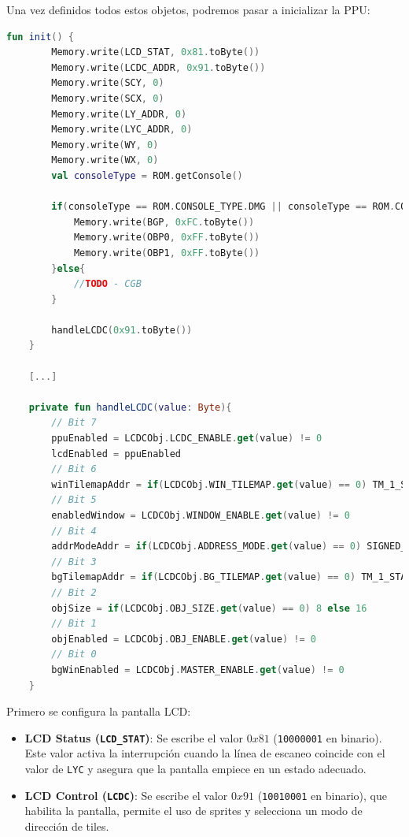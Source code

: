 Una vez definidos todos estos objetos, podremos pasar a inicializar la PPU:

\begin{lstlisting}[language=Kotlin, caption={Inicialización de la PPU.}, label={code:ppuinit}]
    fun init() {
        Memory.write(LCD_STAT, 0x81.toByte())
        Memory.write(LCDC_ADDR, 0x91.toByte())
        Memory.write(SCY, 0)
        Memory.write(SCX, 0)
        Memory.write(LY_ADDR, 0)
        Memory.write(LYC_ADDR, 0)
        Memory.write(WY, 0)
        Memory.write(WX, 0)
        val consoleType = ROM.getConsole()

        if(consoleType == ROM.CONSOLE_TYPE.DMG || consoleType == ROM.CONSOLE_TYPE.DMG_CGB) {
            Memory.write(BGP, 0xFC.toByte())
            Memory.write(OBP0, 0xFF.toByte())
            Memory.write(OBP1, 0xFF.toByte())
        }else{
            //TODO - CGB
        }

        handleLCDC(0x91.toByte())
    }

    [...]

    private fun handleLCDC(value: Byte){
        // Bit 7
        ppuEnabled = LCDCObj.LCDC_ENABLE.get(value) != 0
        lcdEnabled = ppuEnabled
        // Bit 6
        winTilemapAddr = if(LCDCObj.WIN_TILEMAP.get(value) == 0) TM_1_START else TM_2_START
        // Bit 5
        enabledWindow = LCDCObj.WINDOW_ENABLE.get(value) != 0
        // Bit 4
        addrModeAddr = if(LCDCObj.ADDRESS_MODE.get(value) == 0) SIGNED_TILE_REGION else VRAM_START
        // Bit 3
        bgTilemapAddr = if(LCDCObj.BG_TILEMAP.get(value) == 0) TM_1_START else TM_2_START
        // Bit 2
        objSize = if(LCDCObj.OBJ_SIZE.get(value) == 0) 8 else 16
        // Bit 1
        objEnabled = LCDCObj.OBJ_ENABLE.get(value) != 0
        // Bit 0
        bgWinEnabled = LCDCObj.MASTER_ENABLE.get(value) != 0
    }
\end{lstlisting}

Primero se configura la pantalla LCD:

\begin{itemize}
    \item \textbf{LCD Status (\texttt{LCD\_STAT})}: Se escribe el valor $0x81$ (\texttt{10000001} en binario). Este valor activa la interrupción cuando la línea de escaneo coincide con el valor de \texttt{LYC} y asegura que la pantalla empiece en un estado adecuado.
    \item \textbf{LCD Control (\texttt{LCDC})}: Se escribe el valor $0x91$ (\texttt{10010001} en binario), que habilita la pantalla, permite el uso de sprites y selecciona un modo de dirección de tiles.
\end{itemize}

